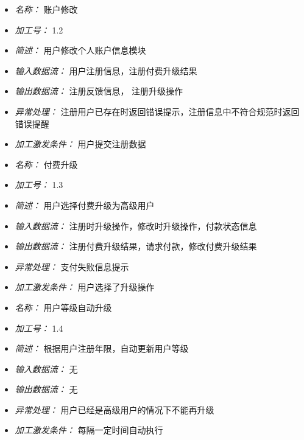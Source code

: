 \vspace{-1mm}


\begin{itemize}
\item \textit{名称： } 账户修改
\item \textit{加工号： } 1.2
\item \textit{简述： } 用户修改个人账户信息模块
\item \textit{输入数据流： } 用户注册信息，注册付费升级结果
\item \textit{输出数据流： } 注册反馈信息， 注册升级操作
\item \textit{异常处理： } 注册用户已存在时返回错误提示，注册信息中不符合规范时返回错误提醒 
\item \textit{加工激发条件： } 用户提交注册数据

\end{itemize}


\vspace{-1mm}


\begin{itemize}
\item \textit{名称： } 付费升级
\item \textit{加工号： } 1.3
\item \textit{简述： } 用户选择付费升级为高级用户
\item \textit{输入数据流： } 注册时升级操作，修改时升级操作，付款状态信息 
\item \textit{输出数据流： } 注册付费升级结果，请求付款，修改付费升级结果 
\item \textit{异常处理： } 支付失败信息提示
\item \textit{加工激发条件： } 用户选择了升级操作

\end{itemize}


\vspace{-1mm}


\begin{itemize}
\item \textit{名称： } 用户等级自动升级
\item \textit{加工号： } 1.4
\item \textit{简述： } 根据用户注册年限，自动更新用户等级 
\item \textit{输入数据流： } 无
\item \textit{输出数据流： } 无
\item \textit{异常处理： } 用户已经是高级用户的情况下不能再升级 
\item \textit{加工激发条件： } 每隔一定时间自动执行

\end{itemize}


